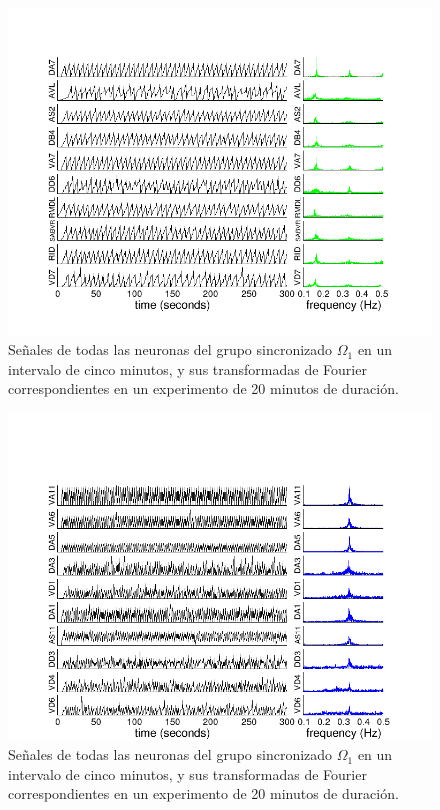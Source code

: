  \begin{figure}[h!]
	\centering\includegraphics[width=\imsize]{cluster1.png}
	\caption[ Señales de todas las neuronas del grupo sincronizado $\Omega_1$ en un intervalo de cinco minutos, y sus transformadas de Fourier correspondientes en un experimento de 20 minutos de duración.]{Señales de todas las neuronas del grupo sincronizado $\Omega_1$ en un intervalo de cinco minutos, y sus transformadas de Fourier correspondientes en un experimento de 20 minutos de duración.}\label{fig:cluster_1}
\end{figure}
 \begin{figure}[h!]
	\centering\includegraphics[width=\imsize]{cluster_2.png}
	\caption[ Señales de todas las neuronas del grupo sincronizado $\Omega_2$ en un intervalo de cinco minutos, y sus transformadas de Fourier correspondientes en un experimento de 20 minutos de duración.]{Señales de todas las neuronas del grupo sincronizado $\Omega_1$ en un intervalo de cinco minutos, y sus transformadas de Fourier correspondientes en un experimento de 20 minutos de duración.}\label{fig:cluster_2}
\end{figure}
